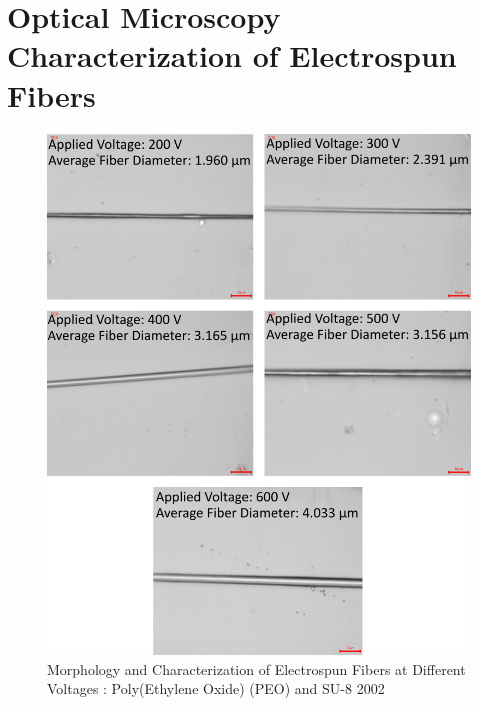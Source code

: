 
\chapter{Optical Microscopy Characterization of Electrospun Fibers} %

\label{Appendix_MicroscopyChar} %

\begin{figure}[!th]
\centering
\includegraphics[scale=0.55]{./Figures/microscopy_peo_su8.png}
\decoRule
\caption[Morphology and Characterization of Electrospun Fibers at Different Voltages : Poly(Ethylene Oxide) (PEO) and SU-8 2002 ]{Morphology and Characterization of Electrospun Fibers at Different Voltages : Poly(Ethylene Oxide) (PEO) and SU-8 2002 }
\label{fig:microscopy_peo_su8}
\end{figure}

